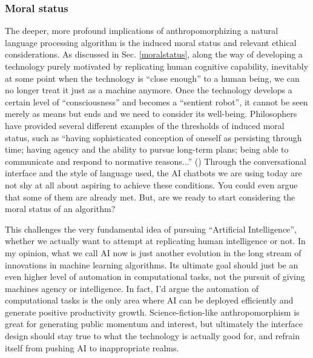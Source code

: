 \documentclass[12pt]{article}
\begin{document}
\subsubsection{Moral status}
The deeper, more profound implications of anthropomorphizing a natural language processing algorithm is the induced moral status and relevant ethical considerations. As discussed in Sec. \ref{moralstatus}, along the way of developing a technology purely motivated by replicating human cognitive capability, inevitably at some point when the technology is ``close enough'' to a human being, we can no longer treat it just as a machine anymore. Once the technology develops a certain level of ``consciousness'' and becomes a ``sentient robot'', it cannot be seen merely as means but ends and we need to consider its well-being. Philosophers have provided several different examples of the thresholds of induced moral status, such as ``having sophisticated conception of oneself as persisting through time; having agency and the ability to pursue long-term plans; being able to communicate and respond to normative reasons...'' (\cite{bostromdeeputopia}) Through the conversational interface and the style of language used, the AI chatbots we are using today are not shy at all about aspiring to achieve these conditions. You could even argue that some of them are already met. But, are we ready to start considering the moral status of an algorithm?

This challenges the very fundamental idea of pursuing ``Artificial Intelligence'', whether we actually want to attempt at replicating human intelligence or not. In my opinion, what we call AI now is just another evolution in the long stream of innovations in machine learning algorithms. Its ultimate goal should just be an even higher level of automation in computational tasks, not the pursuit of giving machines agency or intelligence. In fact, I'd argue the automation of computational tasks is the only area where AI can be deployed efficiently and generate positive productivity growth. Science-fiction-like anthropomorphism is great for generating public momentum and interest, but ultimately the interface design should stay true to what the technology is actually good for, and refrain itself from pushing AI to inappropriate realms. 
\end{document}

